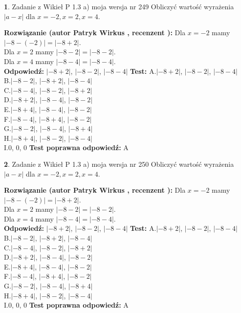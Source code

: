 \documentclass[12pt, a4paper]{article}
\theoremstyle{definition} %
\newtheorem{zad}{}
\newcommand{\zadStart}[1]{\begin{zad}#1\newline}
\newcommand{\zadStop}{\end{zad}}
\newcommand{\rozwStart}[2]{\noindent \textbf{Rozwiązanie (autor #1 , recenzent #2): }\newline}
\newcommand{\rozwStop}{\newline}
\newcommand{\odpStart}{\noindent \textbf{Odpowiedź:}\newline}
\newcommand{\odpStop}{\newline}
\newcommand{\testStart}{\noindent \textbf{Test:}\newline}
\newcommand{\testStop}{\newline}
\newcommand{\kluczStart}{\noindent \textbf{Test poprawna odpowiedź:}\newline}
\newcommand{\kluczStop}{\newline}
\begin{document}
\zadStart{Zadanie z Wikieł P 1.3 a) moja wersja nr 249}
Obliczyć wartość wyrażenia $|a - x|$ dla $x=-2,x=2,x=4$.
\zadStop
\rozwStart{Patryk Wirkus}{}
Dla $x = -2$ mamy $|-8 - (-2)| = |-8 + 2|$.\\
Dla $x = 2$ mamy $|-8 - 2| = |-8 - 2|$.\\
Dla $x = 4$ mamy $|-8 - 4| = |-8 - 4|$.\\
\rozwStop
\odpStart
$|-8 + 2|$, $|-8 - 2|$, $|-8 - 4|$
\odpStop
\testStart
A.$|-8 + 2|$, $|-8 - 2|$, $|-8 - 4|$\\
B.$|-8 - 2|$, $|-8 + 2|$, $|-8 - 4|$\\
C.$|-8 - 4|$, $|-8 - 2|$, $|-8 + 2|$\\
D.$|-8 + 2|$, $|-8 - 4|$, $|-8 - 2|$\\
E.$|-8 + 4|$, $|-8 - 4|$, $|-8 - 2|$\\
F.$|-8 - 4|$, $|-8 + 4|$, $|-8 - 2|$\\
G.$|-8 - 2|$, $|-8 - 4|$, $|-8 + 4|$\\
H.$|-8 + 4|$, $|-8 - 2|$, $|-8 - 4|$\\
I.$0$, $0$, $0$
\testStop
\kluczStart
A
\kluczStop



\zadStart{Zadanie z Wikieł P 1.3 a) moja wersja nr 250}
Obliczyć wartość wyrażenia $|a - x|$ dla $x=-2,x=2,x=4$.
\zadStop
\rozwStart{Patryk Wirkus}{}
Dla $x = -2$ mamy $|-8 - (-2)| = |-8 + 2|$.\\
Dla $x = 2$ mamy $|-8 - 2| = |-8 - 2|$.\\
Dla $x = 4$ mamy $|-8 - 4| = |-8 - 4|$.\\
\rozwStop
\odpStart
$|-8 + 2|$, $|-8 - 2|$, $|-8 - 4|$
\odpStop
\testStart
A.$|-8 + 2|$, $|-8 - 2|$, $|-8 - 4|$\\
B.$|-8 - 2|$, $|-8 + 2|$, $|-8 - 4|$\\
C.$|-8 - 4|$, $|-8 - 2|$, $|-8 + 2|$\\
D.$|-8 + 2|$, $|-8 - 4|$, $|-8 - 2|$\\
E.$|-8 + 4|$, $|-8 - 4|$, $|-8 - 2|$\\
F.$|-8 - 4|$, $|-8 + 4|$, $|-8 - 2|$\\
G.$|-8 - 2|$, $|-8 - 4|$, $|-8 + 4|$\\
H.$|-8 + 4|$, $|-8 - 2|$, $|-8 - 4|$\\
I.$0$, $0$, $0$
\testStop
\kluczStart
A
\kluczStop
\end{document}
